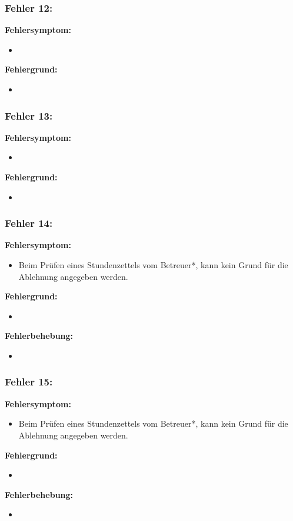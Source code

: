 \subsubsection{Fehler 12:}%
\textbf{Fehlersymptom:}
	\begin{itemize}
		\item 
	\end{itemize}
\textbf{Fehlergrund:}
	\begin{itemize}
		\item 
	\end{itemize}
	
\subsubsection{Fehler 13:}%
\textbf{Fehlersymptom:}
	\begin{itemize}
		\item 
	\end{itemize}
\textbf{Fehlergrund:}
	\begin{itemize}
		\item 
	\end{itemize}
	
\subsubsection{Fehler 14:}%
\textbf{Fehlersymptom:}
	\begin{itemize}
		\item Beim Prüfen eines Stundenzettels vom Betreuer*, kann kein Grund für die Ablehnung angegeben werden.
	\end{itemize}
\textbf{Fehlergrund:}
	\begin{itemize}
		\item 
	\end{itemize}
\textbf{Fehlerbehebung:}
	\begin{itemize}
		\item 
	\end{itemize}

\subsubsection{Fehler 15:}%
\textbf{Fehlersymptom:}
	\begin{itemize}
		\item Beim Prüfen eines Stundenzettels vom Betreuer*, kann kein Grund für die Ablehnung angegeben werden.
	\end{itemize}
\textbf{Fehlergrund:}
	\begin{itemize}
		\item 
	\end{itemize}
\textbf{Fehlerbehebung:}
	\begin{itemize}
		\item 
	\end{itemize}
